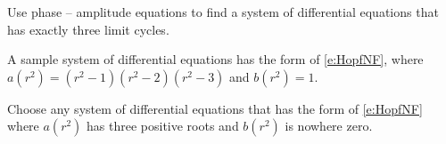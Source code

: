 \documentclass{ximera}
\begin{document}
\begin{exercise} \label{c8.3.4}
Use phase -- amplitude equations to find a system of differential equations 
that has exactly three limit cycles.

\begin{solution}

\soln A sample system of differential equations has the form of 
\eqref{e:HopfNF}, where $a(r^2) = (r^2-1)(r^2-2)(r^2-3)$
and $b(r^2) = 1$.

\soln  Choose any system of differential equations that has the form of 
\eqref{e:HopfNF} where $a(r^2)$ has three positive roots
and $b(r^2)$ is nowhere zero.


\end{solution}
\end{exercise}
\end{document}
